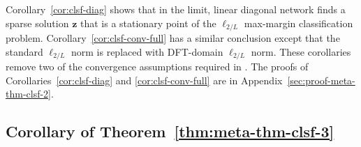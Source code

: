 \documentclass{article} %
\def\vz{{\bm{z}}}
\begin{document}
Corollary~\ref{cor:clsf-diag} shows that in the limit, linear diagonal network finds a sparse solution $\vz$ that is a stationary point of the $\ell_{2/L}$ max-margin classification problem. Corollary~\ref{cor:clsf-conv-full} has a similar conclusion except that the standard $\ell_{2/L}$ norm is replaced with DFT-domain $\ell_{2/L}$ norm. These corollaries remove two of the convergence assumptions required in \citet{gunasekar2018implicit}.
The proofs of Corollaries~\ref{cor:clsf-diag} and \ref{cor:clsf-conv-full} are in Appendix~\ref{sec:proof-meta-thm-clsf-2}.

\subsection{Corollary of Theorem~\ref{thm:meta-thm-clsf-3}}
\label{sec:cor-meta-thm-clsf-3}
\end{document}
